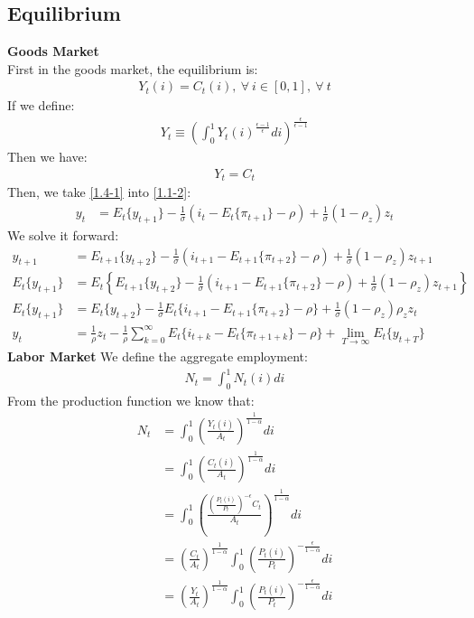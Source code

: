 \documentclass{article}
\numberwithin{equation}{section}
\begin{document}
\subsection{Equilibrium}
\textbf{Goods Market}\\
First in the goods market, the equilibrium is:
	\begin{align*}
		Y_t(i) = C_t(i),\ \forall\ i \in [0, 1],\ \forall\ t 
	\end{align*}
If we define:
	\begin{align*}
		Y_t \equiv \left(\int^1_0 Y_t(i)^{\frac{\epsilon-1}{\epsilon}} di \right)^{\frac{\epsilon}{\epsilon-1}}
	\end{align*}
Then we have:
	\begin{align}
		Y_t = C_t \label{1.4-1}
	\end{align}
Then, we take \eqref{1.4-1} into \eqref{1.1-2}:
	\begin{align}
		y_t &= E_t\{y_{t+1}\} - \frac{1}{\sigma}(i_t - E_t\{\pi_{t+1}\} - \rho) + \frac{1}{\sigma}(1 - \rho_z)z_t \label{1.4-y}
	\end{align}
We solve it forward:
	\begin{align*}
		y_{t+1} &= E_{t+1}\{y_{t+2}\} - \frac{1}{\sigma}(i_{t+1} - E_{t+1}\{\pi_{t+2}\} - \rho) + \frac{1}{\sigma}(1 - \rho_z)z_{t+1}\\
		E_t\{y_{t+1}\} &= E_t\left\{E_{t+1}\{y_{t+2}\} - \frac{1}{\sigma}(i_{t+1} - E_{t+1}\{\pi_{t+2}\} - \rho) + \frac{1}{\sigma}(1 - \rho_z)z_{t+1}\right\}\\
		E_t\{y_{t+1}\} &= E_{t}\{y_{t+2}\} - \frac{1}{\sigma}E_t\{i_{t+1} - E_{t+1}\{\pi_{t+2}\} - \rho\} + \frac{1}{\sigma}(1 - \rho_z)\rho_z z_{t}\\
		y_t &= \frac{1}{\rho}z_t - \frac{1}{\rho} \sum\limits^\infty_{k=0} E_t\{i_{t+k} - E_{t}\{\pi_{t+1+k}\} - \rho\} + \lim\limits_{T\to\infty} E_t\{y_{t+T}\} 
	\end{align*}
\textbf{Labor Market}
We define the aggregate employment:
	\begin{align*}
		N_t = \int^1_0 N_t(i) di
	\end{align*}
From the production function we know that:
	\begin{align*}
		N_t &= \int^1_0 \left( \frac{Y_t(i)}{A_t} \right)^{\frac{1}{1-\alpha}} di\\
		&= \int^1_0 \left( \frac{C_t(i)}{A_t} \right)^{\frac{1}{1-\alpha}} di\\
		&= \int^1_0 \left( \frac{\left( \frac{P_t(i)}{P_t} \right)^{-\epsilon} C_t}{A_t} \right)^{\frac{1}{1-\alpha}} di\\
		&= \left( \frac{C_t}{A_t} \right)^{\frac{1}{1-\alpha}} \int^1_0 \left( \frac{P_t(i)}{P_t} \right)^{-\frac{\epsilon}{1-\alpha}} di\\
		&= \left( \frac{Y_t}{A_t} \right)^{\frac{1}{1-\alpha}} \int^1_0 \left( \frac{P_t(i)}{P_t} \right)^{-\frac{\epsilon}{1-\alpha}} di
	\end{align*}
\end{document}

